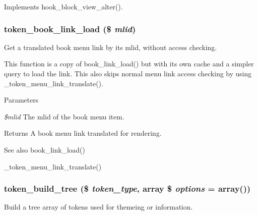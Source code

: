 \label{token_8module_a5e30af58ef42a9fb1b3d3723e2796c9d}
Implements hook\_\-block\_\-view\_\-alter(). \hypertarget{token_8module_a0fa0866bc1e7362481041171d8d173a1}{
\subsubsection[{token\_\-book\_\-link\_\-load}]{\setlength{\rightskip}{0pt plus 5cm}token\_\-book\_\-link\_\-load (\$ {\em mlid})}}
\label{token_8module_a0fa0866bc1e7362481041171d8d173a1}
Get a translated book menu link by its mlid, without access checking.

This function is a copy of book\_\-link\_\-load() but with its own cache and a simpler query to load the link. This also skips normal menu link access checking by using \_\-token\_\-menu\_\-link\_\-translate().


\begin{DoxyParams}{Parameters}
\item[{\em \$mlid}]The mlid of the book menu item.\end{DoxyParams}
\begin{DoxyReturn}{Returns}
A book menu link translated for rendering.
\end{DoxyReturn}
\begin{DoxySeeAlso}{See also}
book\_\-link\_\-load() 

\_\-token\_\-menu\_\-link\_\-translate() 
\end{DoxySeeAlso}
\hypertarget{token_8module_ad32c69ba0eb229c02bf4b49227d49379}{
\subsubsection[{token\_\-build\_\-tree}]{\setlength{\rightskip}{0pt plus 5cm}token\_\-build\_\-tree (\$ {\em token\_\-type}, \/  array \$ {\em options} = {\ttfamily array()})}}
\label{token_8module_ad32c69ba0eb229c02bf4b49227d49379}
Build a tree array of tokens used for themeing or information.


